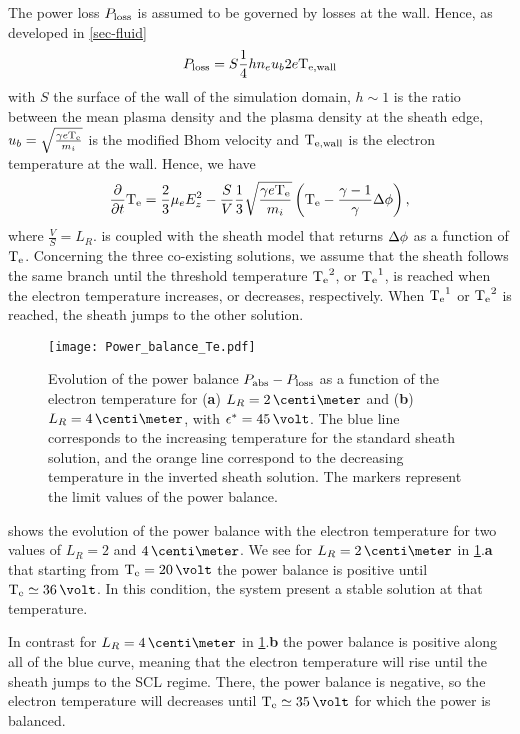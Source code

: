     The power loss $P_{\rm loss}$ is assumed to be governed by losses at the wall.
    Hence, as developed in \cref{sec-fluid}
    \begin{equation} \label{eq-Ploss}
      P_{\rm loss} = S \frac{1}{4} h n_e u_b 2 e\mathrm{T_{e, wall}}
    \end{equation}
    with $S$ the surface of the wall of the simulation domain, $h \sim 1$ is the ratio between the mean plasma density and the plasma density at the sheath edge, $u_b = \sqrt{\frac{\gamma e \mathrm{T_e}}{m_i}}$ is the modified Bhom velocity and $\mathrm{T_{e, wall}}$ is the electron temperature at the wall.
    Hence, we have
    \begin{equation} \label{eq-MG_bis}
    \frac{\partial }{\partial t} \mathrm{T_e} = \frac{2}{3} \mu_e  E_z^2 - \frac{S}{V} \frac{1}{3} \sqrt{\frac{\gamma e \mathrm{T_e}}{m_i}}  \left( \mathrm{T_e} - \frac{\gamma - 1}{\gamma} \Delta \phi \right),
    \end{equation}
    where $\frac{V}{S} = L_R$.
     is coupled with the sheath model that returns $\Delta \phi$ as a function of $\mathrm{T_e}$.
    Concerning the three co-existing solutions, we assume that the sheath follows the same branch until the threshold temperature $\mathrm{T_e}^2$, or $\mathrm{T_e}^1$, is reached when the electron temperature increases, or decreases, respectively.
    When $\mathrm{T_e}^1$ or $\mathrm{T_e}^2$ is reached, the sheath jumps to the other solution.
    
    
    \begin{figure}[!hbt]
      \centering
      \texttt{[image: Power\_balance\_Te.pdf]}
      \caption{Evolution of the power balance $P_{\rm abs}-P_{\rm loss}$ as a function of the electron temperature for ({\bf a}) $L_R=2\,\centi\meter$ and ({\bf b}) $L_R=4\,\centi\meter$, with $\crover=45\,\volt$. The blue line corresponds to the increasing temperature for the standard sheath solution, and the orange line correspond to the decreasing temperature in the inverted sheath solution. The markers represent the limit values of the power balance.}
      \label{fig-powerbalance}
    \end{figure}
    
     shows the evolution of the power balance with the electron temperature for two values of $L_R=2$ and $4\,\centi\meter$.
    We see for $L_R=2\,\centi\meter$ in \cref{fig-powerbalance}.{\bf a} that starting from $\Te=20\,\volt$ the power balance is positive until $\Te\simeq36\,\volt$.
    In this condition, the system present a stable solution at that temperature.
    
    In contrast for $L_R=4\,\centi\meter$ in \cref{fig-powerbalance}.{\bf b} the power balance is positive along all of the blue curve, meaning that the electron temperature will rise until the sheath jumps to the \ac{SCL} regime.
    There, the power balance is negative, so the electron temperature will decreases until $\Te\simeq35\,\volt$ for which the power is balanced.
    
